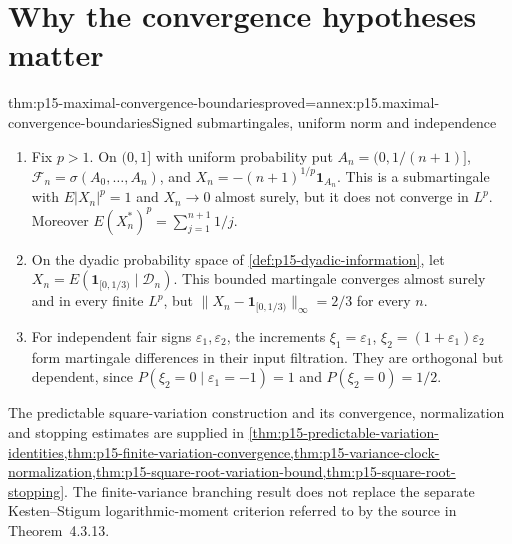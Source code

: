 \section{Why the convergence hypotheses matter}
\label{sec:p15-maximal-convergence-boundaries}

\begin{hbtheorem}{thm:p15-maximal-convergence-boundaries}{proved=annex:p15.maximal-convergence-boundaries}{Signed submartingales, uniform norm and independence}
\begin{enumerate}
\item Fix \(p>1\). On \((0,1]\) with uniform probability put
      \(A_n=(0,1/(n+1)]\), \(\mathcal F_n=\sigma(A_0,\ldots,A_n)\), and
      \(X_n=-(n+1)^{1/p}\mathbf1_{A_n}\).
      This is a submartingale with \(E|X_n|^p=1\) and \(X_n\to0\)
      almost surely, but it does not converge in \(L^p\).
      Moreover \(E(X_n^*)^p=\sum_{j=1}^{n+1}1/j\).
\item On the dyadic probability space of
      \cref{def:p15-dyadic-information}, let
      \(X_n=E(\mathbf1_{[0,1/3)}\mid\mathcal D_n)\).
      This bounded martingale converges almost surely and in every
      finite \(L^p\), but
      \(\|X_n-\mathbf1_{[0,1/3)}\|_\infty=2/3\) for every \(n\).
\item For independent fair signs \(\varepsilon_1,\varepsilon_2\),
      the increments
      \(\xi_1=\varepsilon_1\), \(\xi_2=(1+\varepsilon_1)\varepsilon_2\)
      form martingale differences in their input filtration.
      They are orthogonal but dependent, since
      \(P(\xi_2=0\mid\varepsilon_1=-1)=1\) and \(P(\xi_2=0)=1/2\).
\end{enumerate}
\end{hbtheorem}

The predictable square-variation construction and its convergence,
normalization and stopping estimates are supplied in
\cref{thm:p15-predictable-variation-identities,thm:p15-finite-variation-convergence,thm:p15-variance-clock-normalization,thm:p15-square-root-variation-bound,thm:p15-square-root-stopping}.
The finite-variance branching result does not replace the
separate Kesten--Stigum logarithmic-moment criterion referred to by the
source in Theorem~4.3.13.
